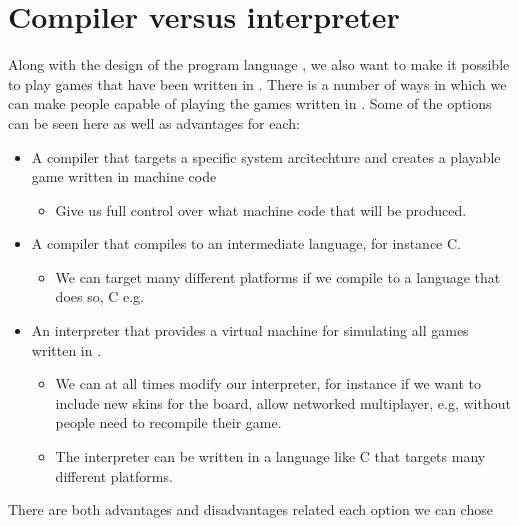 \section{Compiler versus interpreter}

Along with the design of the program language \productname{}, we also want to make it possible to play games that have been written in \productname{}. There is a number of ways in which we can make people capable of playing the games written in \productname{}. Some of the options can be seen here as well as advantages for each:
\begin{itemize}
\item A \productname{} compiler that targets a specific system arcitechture and creates a playable game written in machine code
\begin{itemize}
\item Give us full control over what machine code that will be produced.
\end{itemize}
\item A \productname{} compiler that compiles to an intermediate language, for instance C.
\begin{itemize}
\item We can target many different platforms if we compile to a language that does so, C e.g.
\end{itemize}
\item An interpreter that provides a virtual machine for simulating all games written in \productname{}.
\begin{itemize}
\item We can at all times modify our interpreter, for instance if we want to include new skins for the board, allow networked multiplayer, e.g, without people need to recompile their game. 
\item The interpreter can be written in a language like C that targets many different platforms.
\end{itemize}
\end{itemize}
There are both advantages and disadvantages related each option we can chose
